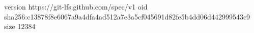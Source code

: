 version https://git-lfs.github.com/spec/v1
oid sha256:c13878f8e6067a9a4dfa4ad512a7e3a5cf045691d82fe5b4dd06d442999543c9
size 12384
